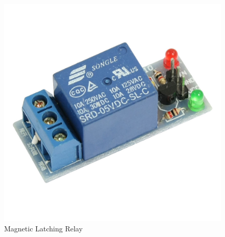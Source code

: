 \documentclass[12pt,a4paper]{report}
\begin{document}
\begin{figure}[!h]
	\centering
	\includegraphics[scale=0.1]{relay}
	\caption{Magnetic Latching Relay}
\end{figure}
\end{document}
